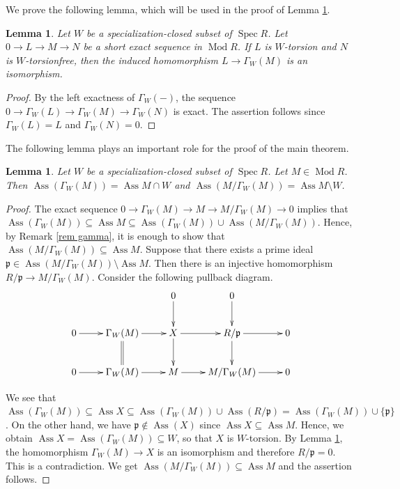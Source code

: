 \documentclass{amsart}
\newtheorem{lem}[thm]{Lemma}
\theoremstyle{definition}
\theoremstyle{remark}
\def\Ass{\operatorname{Ass}}
\def\Mod{\operatorname{Mod}}
\def\p{\mathfrak{p}}
\def\Spec{\operatorname{Spec}}
\begin{document}
We prove the following lemma, which will be used in the proof of Lemma \ref{formula gamma ass}.

\begin{lem}\label{lem ex seq torsion}
Let $W$ be a specialization-closed subset of $\Spec R$.
Let $0\to L\to M\to N$ be a short exact sequence in $\Mod R$.
If $L$ is $W$-torsion and $N$ is $W$-torsionfree, then the induced homomorphism $L\to \Gamma_W(M)$ is an isomorphism.
\end{lem}

\begin{proof}
By the left exactness of $\Gamma_W(-)$, the sequence $0\to \Gamma_W(L)\to \Gamma_W(M)\to\Gamma_W(N)$ is exact. The assertion follows since $\Gamma_W(L)=L$ and $\Gamma_W(N)=0$.
\end{proof}

The following lemma plays an important role for the proof of the main theorem.

\begin{lem}\label{formula gamma ass}
Let $W$ be a specialization-closed subset of $\Spec R$.
Let $M\in\Mod R$.
Then $\Ass(\Gamma_W(M))=\Ass M\cap W$ and $\Ass(M/\Gamma_W(M))=\Ass M\setminus W$.
\end{lem}

\begin{proof}
The exact sequence $0\to\Gamma_W(M)\to M\to M/\Gamma_W(M)\to0$ implies that $\Ass(\Gamma_W(M))\subseteq\Ass M\subseteq\Ass(\Gamma_W(M))\cup\Ass(M/\Gamma_W(M))$. Hence, by Remark \ref{rem gamma}, it is enough to show that $\Ass(M/\Gamma_W(M))\subseteq\Ass M$. Suppose that there exists a prime ideal $\p\in\Ass(M/\Gamma_W(M))\setminus\Ass M$. Then there is an injective homomorphism $R/\p\to M/\Gamma_W(M)$. Consider the following pullback diagram.
\[\xymatrix{&&0\ar[d]&0\ar[d]&\\
0\ar[r]&\Gamma_W(M)\ar[r]\ar@{=}[d]&X\ar[r]\ar[d]&R/\p\ar[r]\ar[d]&0\\
0\ar[r]&\Gamma_W(M)\ar[r]&M\ar[r]&M/\Gamma_W(M)\ar[r]&0}\]

We see that $\Ass(\Gamma_W(M))\subseteq\Ass X\subseteq\Ass(\Gamma_W(M))\cup\Ass(R/\p)=\Ass(\Gamma_W(M))\cup\{\p\}$. On the other hand, we have $\p\notin\Ass(X)$ since $\Ass X\subseteq\Ass M$. Hence, we obtain $\Ass X=\Ass(\Gamma_W(M))\subseteq W$, so that $X$ is $W$-torsion. By Lemma \ref{lem ex seq torsion}, the homomorphism $\Gamma_W(M)\to X$ is an isomorphism and therefore $R/\p=0$. This is a contradiction. We get $\Ass(M/\Gamma_W(M))\subseteq\Ass M$ and the assertion follows.
\end{proof}
\end{document}
